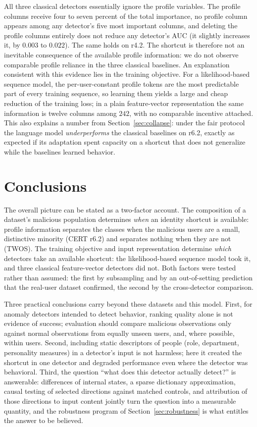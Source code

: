 \documentclass[10pt]{article}
\begin{document}
All three classical detectors essentially ignore the profile variables.
The profile columns receive four to seven percent of the total
importance, no profile column appears among any detector's five most
important columns, and deleting the profile columns entirely does not
reduce any detector's AUC (it slightly increases it, by $0.003$ to
$0.022$). The same holds on r4.2. The shortcut is therefore not an
inevitable consequence of the available profile information: we do not
observe comparable profile reliance in the three classical baselines.
An explanation consistent with this evidence lies in the training
objective. For a likelihood-based sequence model, the per-user-constant
profile tokens are the most predictable part of every training
sequence, so learning them yields a large and cheap reduction of the
training loss; in a plain feature-vector representation the same
information is twelve columns among $242$, with no comparable incentive
attached. This also explains a number from
Section~\ref{sec:collapse}: under the fair protocol the language model
\emph{underperforms} the classical baselines on r6.2, exactly as
expected if its adaptation spent capacity on a shortcut that does not
generalize while the baselines learned behavior.

\section{Conclusions}
\label{sec:conclusions}

The overall picture can be stated as a two-factor account. The
composition of a dataset's malicious population determines \emph{when}
an identity shortcut is available: profile information separates the
classes when the malicious users are a small, distinctive minority
(CERT r6.2) and separates nothing when they are not (TWOS). The
training objective and input representation determine \emph{which}
detectors take an available shortcut: the likelihood-based sequence
model took it, and three classical feature-vector detectors did not.
Both factors were tested rather than assumed: the first by subsampling
and by an out-of-setting prediction that the real-user dataset
confirmed, the second by the cross-detector comparison.

Three practical conclusions carry beyond these datasets and this
model. First, for anomaly detectors intended to detect behavior,
ranking quality alone is not evidence of success; evaluation should
compare malicious observations only against normal observations from
equally unseen users, and, where possible, within users. Second,
including static descriptors of people (role, department, personality
measures) in a detector's input is not harmless; here it created the
shortcut in one detector and degraded performance even where the
detector was behavioral. Third, the question ``what does this detector
actually detect?'' is answerable: differences of internal states, a
sparse dictionary approximation, causal testing of selected directions
against matched controls, and attribution of those directions to input
content jointly turn the question into a measurable quantity, and the
robustness program of Section~\ref{sec:robustness} is what entitles the
answer to be believed.
\end{document}
